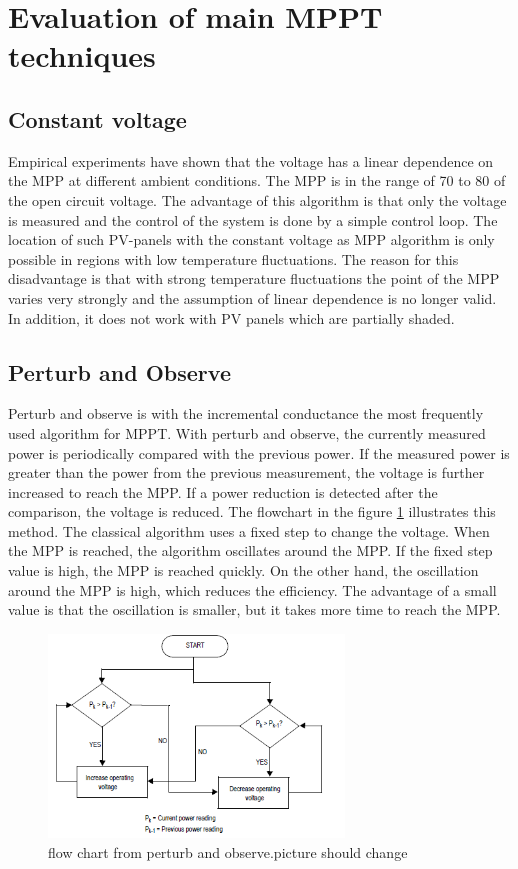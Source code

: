 \section{Evaluation of main MPPT techniques\label{MPPTalgo}}

\subsection{Constant voltage}
Empirical experiments have shown that the voltage has a linear dependence on the MPP at different ambient conditions. The MPP is in the range of 70 to 80 of the open circuit voltage. The advantage of this algorithm is that only the voltage is measured and the control of the system is done by a simple control loop. The location of such PV-panels with the constant voltage as MPP algorithm is only possible in regions with low temperature fluctuations. The reason for this disadvantage is that with strong temperature fluctuations the point of the MPP varies very strongly and the assumption of linear dependence is no longer valid. In addition, it does not work with PV panels which are partially shaded.\cite{}

\subsection{Perturb and Observe}
Perturb and observe is with the incremental conductance the most frequently used algorithm for MPPT. With perturb and observe, the currently measured power is periodically compared with the previous power. If the measured power is greater than the power from the previous measurement, the voltage is further increased to reach the MPP. If a power reduction is detected after the comparison, the voltage is reduced. The flowchart in the figure \ref{fcperturbandobserve} illustrates this method. The classical algorithm uses a fixed step to change the voltage. When the MPP is reached, the algorithm oscillates around the MPP. If the fixed step value is high, the MPP is reached quickly. On the other hand, the oscillation around the MPP is high, which reduces the efficiency. The advantage of a small value is that the oscillation is smaller, but it takes more time to reach the MPP.

\begin{figure}[htbp]
	\begin{center}
		\includegraphics[width=0.7\textwidth]{../Pictures/flow_chart_perturb_observe}
		\caption{flow chart from perturb and observe.picture should change }
		\label{fcperturbandobserve}
	\end{center}	
\end{figure}

